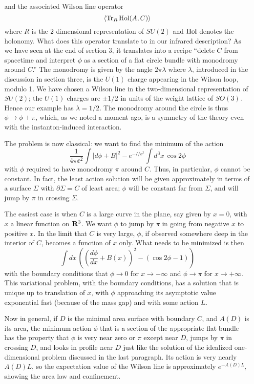 \noindent
and the associated Wilson line operator
\begin{equation}
\langle \operatorname{\rm Tr}_R\operatorname{\rm Hol}(A,C)\rangle
\end{equation}
where $R$ is the $2$-dimensional representation of $SU(2)$ and $\operatorname{\rm Hol}$
denotes the
holonomy. What does this operator translate to in our infrared description?
As we have seen at the end of section 3, it translates into a recipe ``delete
$C$ from spacetime and interpret $\phi$ as a section of a flat circle
bundle with monodromy around $C$.'' The monodromy is given by the angle
$2\pi \lambda$ where $\lambda$, introduced in the discussion in section
three,
is the $U(1)$ charge appearing in the Wilson loop, modulo 1.  We have chosen
a Wilson line in the two-dimensional representation of $SU(2)$; the
$U(1)$ charges are $\pm 1/2$ in units of the weight lattice of $SO(3)$.
Hence our example has $\lambda=1/2$.
The monodromy around the circle is thus $\phi\to\phi+\pi$, which,
as we noted a moment ago, is a symmetry of the theory even with
the instanton-induced interaction.

The problem is now classical: we want to find the minimum of the action
\begin{equation}
 \frac1{4\pi\ee^2}\int|d\phi+B|^2-e^{-I/\ee^2}\int
d^3x\,\cos 2\phi
\end{equation}
with $\phi$ required to have monodromy $\pi$ around $C$.
Thus, in particular, $\phi$ cannot be constant.
   In fact, the least action solution will be given
approximately in terms of a
surface $\Sigma$ with $\partial\Sigma=C$ of least area; $\phi$ will be constant
 far
from $\Sigma$, and will jump by $\pi $ in crossing $\Sigma$.

The easiest case is when $C$ is a large curve in the plane, say    given by
$x=0$, with $x$ a linear function on ${\bf R}^3$.
We want $\phi$ to jump by $\pi$ in going from negative $x$ to positive
$x$.   In the limit that $C$ is very large, $\phi$, if observed
somewhere deep in the interior of $C$, becomes a function of
$x$ only.
  What needs to be minimized is then
\begin{equation}
\int dx\,((\frac{d\phi}{dx}+B(x))^2-(\cos 2\phi-1))
\end{equation}
with the boundary conditions that $\phi\to 0$ for $x\to -\infty$ and
$\phi\to \pi$ for $x\to+\infty$.
This variational problem,
with the boundary conditions, has a solution that is unique
up to translation of $x$, with $\phi$ approaching its asymptotic
value exponential fast (because of the mass gap) and with some action $L$.

\noindent

Now in general, if $D$ is the minimal area surface with boundary
$C$, and $A(D)$ is its area, the minimum action $\phi$ that is a section
of the appropriate flat bundle has the property that $\phi$ is very
near zero or $\pi$ except near $D$, jumps by $\pi$ in crossing $D$,
and looks in profile near $D$ just like the solution of the idealized
one-dimensional problem discussed in the last paragraph.
Its action is very nearly $A(D)L$, so the expectation value of the Wilson
line is approximately $e^{-A(D)L}$, showing the area law and confinement.


